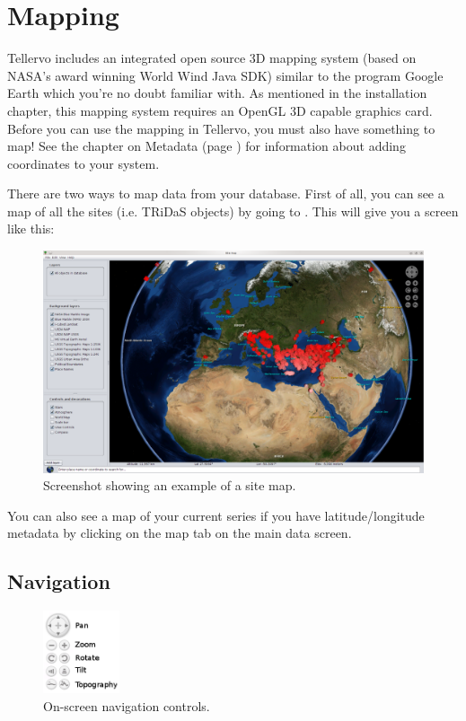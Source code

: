 \chapter{Mapping}
Tellervo includes an integrated open source 3D mapping system (based on NASA's award winning World Wind Java SDK) similar to the program Google Earth which you're no doubt familiar with. As mentioned in the installation chapter, this mapping system requires an OpenGL 3D capable graphics card. Before you can use the mapping in Tellervo, you must also have something to map! See the chapter on Metadata (page \pageref{txt:metadata}) for information about adding coordinates to your system.

There are two ways to map data from your database. First of all, you can see a map of all the sites (i.e. TRiDaS objects) by going to . This will give you a screen like this:

\begin{figure}[hbtp]
  \label{fig:map}
  \centering
  \includegraphics[width=\textwidth]{Images/sitemap.png}
  \caption{Screenshot showing an example of a site map.}
\end{figure}


You can also see a map of your current series if you have latitude/longitude metadata by clicking on the map tab on the main data screen.  
\newpage

\section{Navigation}
\begin{figure}[hbtp]
  \centering
  \includegraphics[width=0.2\textwidth]{Images/wwjcontrols.png}
  \caption{On-screen navigation controls.}
  \label{fig:wwjcontrols}
\end{figure}

